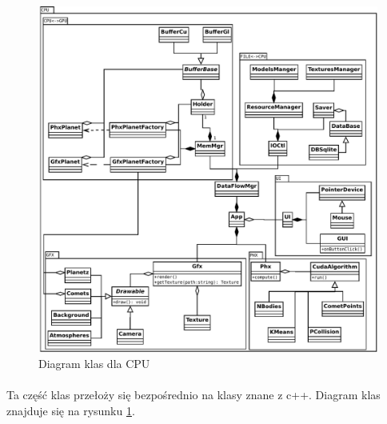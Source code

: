 \begin{figure}[ht!]
	\centering
	\includegraphics[angle=0,width=\textwidth]{img/class_cpu.pdf}
	\caption{Diagram klas dla CPU}
	\label{fig:class_cpu}
\end{figure}

\paragraph{}
Ta część klas przełoży się bezpośrednio na klasy znane z c++. Diagram klas znajduje się na rysunku \ref{fig:class_cpu}.

